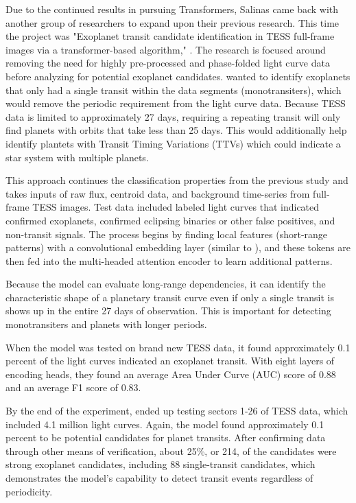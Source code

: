 \documentclass[letterpaper]{article} %
\begin{document}
Due to the continued results in pursuing Transformers, Salinas came back with another group of researchers to expand upon their previous research. This time the project was "Exoplanet transit candidate identification in TESS full-frame images via a transformer-based algorithm," \cite{salinas2025tessfullframe}. The research is focused around removing the need for highly pre-processed and phase-folded light curve data before analyzing for potential exoplanet candidates. \citeauthor{salinas2025tessfullframe} wanted to identify exoplanets that only had a single transit within the data segments (monotransiters), which would remove the periodic requirement from the light curve data. Because TESS data is limited to approximately 27 days, requiring a repeating transit will only find planets with orbits that take less than 25 days. This would additionally help identify plantets with Transit Timing Variations (TTVs) which could indicate a star system with multiple planets. 

This approach continues the classification properties from the previous study \cite{salinas2023distinguishingtransitfalsepositives} and takes inputs of raw flux, centroid data, and background time-series from full-frame TESS images. Test data included labeled light curves that indicated confirmed exoplanets, confirmed eclipsing binaries or other false positives, and non-transit signals. The process begins by finding local features (short-range patterns) with a convolutional embedding layer (similar to \cite{salinas2023distinguishingtransitfalsepositives}), and these tokens are then fed into the multi-headed attention encoder to learn additional patterns.

Because the model can evaluate long-range dependencies, it can identify the characteristic shape of a planetary transit curve even if only a single transit is shows up in the entire 27 days of observation. This is important for detecting monotransiters and planets with longer periods.

When the model was tested on brand new TESS data, it found approximately 0.1 percent of the light curves indicated an exoplanet transit. With eight layers of encoding heads, they found an average Area Under Curve (AUC) score of 0.88 and an average F1 score of 0.83. 

By the end of the experiment, \citeauthor{salinas2025tessfullframe} ended up testing sectors 1-26 of TESS data, which included 4.1 million light curves. Again, the model found approximately 0.1 percent to be potential candidates for planet transits. After confirming data through other means of verification, about 25\%, or 214, of the candidates were strong exoplanet candidates, including 88 single-transit candidates, which demonstrates the model's capability to detect transit events regardless of periodicity.
\end{document}
